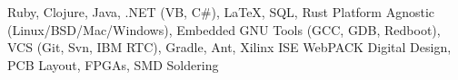 {Ruby, Clojure, Java, .NET (VB, C\#), \LaTeX, SQL, Rust}
{Platform Agnostic (Linux/BSD/Mac/Windows), Embedded GNU Tools (GCC, GDB, Redboot), VCS (Git, Svn, IBM RTC), Gradle, Ant, Xilinx ISE WebPACK}
{Digital Design, PCB Layout, FPGAs, SMD Soldering}
